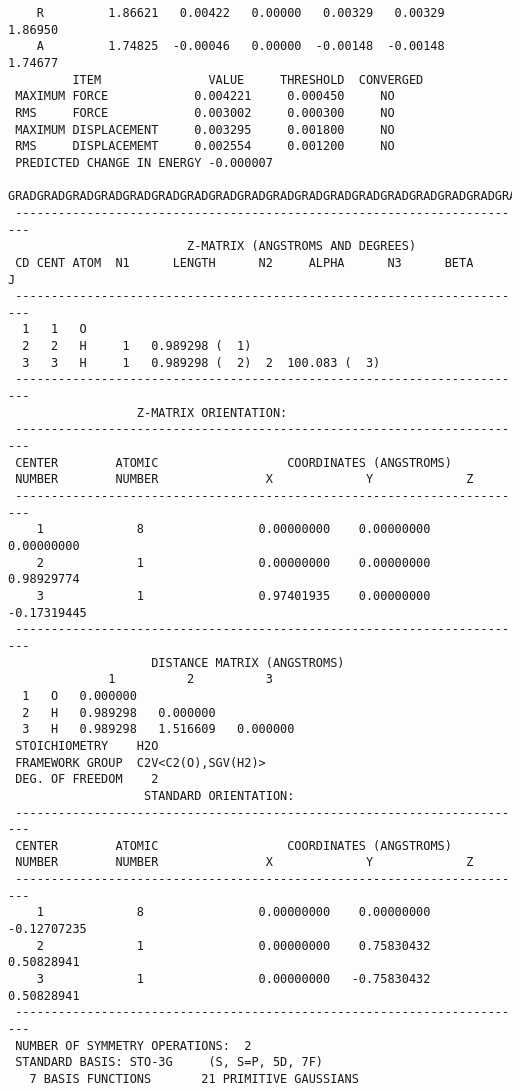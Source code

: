 {\begin{verbatim}
    R         1.86621   0.00422   0.00000   0.00329   0.00329   1.86950
    A         1.74825  -0.00046   0.00000  -0.00148  -0.00148   1.74677
         ITEM               VALUE     THRESHOLD  CONVERGED
 MAXIMUM FORCE            0.004221     0.000450     NO 
 RMS     FORCE            0.003002     0.000300     NO 
 MAXIMUM DISPLACEMENT     0.003295     0.001800     NO 
 RMS     DISPLACEMEMT     0.002554     0.001200     NO 
 PREDICTED CHANGE IN ENERGY -0.000007
 GRADGRADGRADGRADGRADGRADGRADGRADGRADGRADGRADGRADGRADGRADGRADGRADGRADGRAD
 ------------------------------------------------------------------------
                         Z-MATRIX (ANGSTROMS AND DEGREES)
 CD CENT ATOM  N1      LENGTH      N2     ALPHA      N3      BETA       J
 ------------------------------------------------------------------------
  1   1   O 
  2   2   H     1   0.989298 (  1)
  3   3   H     1   0.989298 (  2)  2  100.083 (  3)
 ------------------------------------------------------------------------
                  Z-MATRIX ORIENTATION:
 ------------------------------------------------------------------------
 CENTER        ATOMIC                  COORDINATES (ANGSTROMS)
 NUMBER        NUMBER               X             Y             Z
 ------------------------------------------------------------------------
    1             8                0.00000000    0.00000000    0.00000000
    2             1                0.00000000    0.00000000    0.98929774
    3             1                0.97401935    0.00000000   -0.17319445
 ------------------------------------------------------------------------
                    DISTANCE MATRIX (ANGSTROMS)
              1          2          3
  1   O   0.000000
  2   H   0.989298   0.000000
  3   H   0.989298   1.516609   0.000000
 STOICHIOMETRY    H2O
 FRAMEWORK GROUP  C2V<C2(O),SGV(H2)>
 DEG. OF FREEDOM    2
                   STANDARD ORIENTATION:
 ------------------------------------------------------------------------
 CENTER        ATOMIC                  COORDINATES (ANGSTROMS)
 NUMBER        NUMBER               X             Y             Z
 ------------------------------------------------------------------------
    1             8                0.00000000    0.00000000   -0.12707235
    2             1                0.00000000    0.75830432    0.50828941
    3             1                0.00000000   -0.75830432    0.50828941
 ------------------------------------------------------------------------
 NUMBER OF SYMMETRY OPERATIONS:  2
 STANDARD BASIS: STO-3G     (S, S=P, 5D, 7F)
   7 BASIS FUNCTIONS       21 PRIMITIVE GAUSSIANS

\end{verbatim}}
